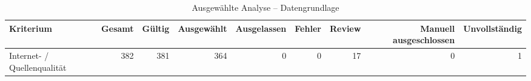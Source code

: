 \begin{table}[htbp]
\centering
\caption{Ausgewählte Analyse -- Datengrundlage}
\begin{tabular}{lrrrrrrrr}
\toprule
Kriterium & Gesamt & Gültig & Ausgewählt & Ausgelassen & Fehler & Review & Manuell ausgeschlossen & Unvollständig \\
\midrule
Internet- / Quellenqualität & 382 & 381 & 364 & 0 & 0 & 17 & 0 & 1 \\
\bottomrule
\end{tabular}
\end{table}

